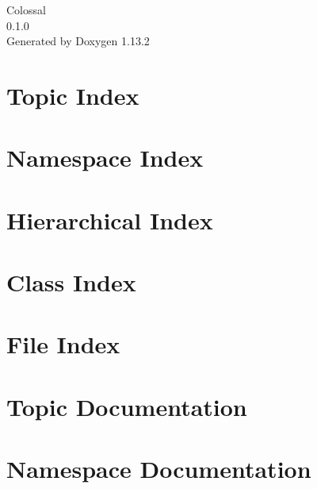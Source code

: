 \documentclass[twoside]{book}
\newcommand{\+}{\discretionary{\mbox{\scriptsize$\hookleftarrow$}}{}{}}
\newcommand{\clearemptydoublepage}{%
    \newpage{\pagestyle{empty}\cleardoublepage}%
  }
\begin{document}
  \raggedbottom
    \hypersetup{pageanchor=false,
                bookmarksnumbered=true,
                pdfencoding=unicode
               }
  \begin{titlepage}
  \vspace*{7cm}
  \begin{center}%
  {\Large Colossal}\\
  [1ex]\large 0.\+1.\+0 \\
  \vspace*{1cm}
  {\large Generated by Doxygen 1.13.2}\\
  \end{center}
  \end{titlepage}
  \clearemptydoublepage
  \tableofcontents
  \clearemptydoublepage
  \hypersetup{pageanchor=true}
\chapter{Topic Index}

\chapter{Namespace Index}

\chapter{Hierarchical Index}

\chapter{Class Index}

\chapter{File Index}

\chapter{Topic Documentation}







\chapter{Namespace Documentation}



\end{document}
